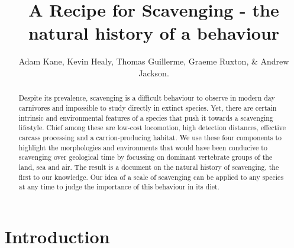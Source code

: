\documentclass[a4paper,12pt]{article}
\title{A Recipe for Scavenging - the natural history of a behaviour}
\author{Adam Kane, Kevin Healy, Thomas Guillerme, Graeme Ruxton, \& Andrew Jackson.}
\begin{document}


\begin{abstract} 
Despite its prevalence, scavenging is a difficult behaviour to observe in modern day carnivores and impossible to study directly in extinct species. 
Yet, there are certain intrinsic and environmental features of a species that push it towards a scavenging lifestyle. Chief among these are low-cost locomotion, high detection distances, effective carcass processing and a carrion-producing habitat. 
We use these four components to highlight the morphologies and environments that would have been conducive to scavenging over geological time by focussing on dominant vertebrate groups of the land, sea and air. 
The result is a document on the natural history of scavenging, the first to our knowledge. 
Our idea of a scale of scavenging can be applied to any species at any time to judge the importance of this behaviour in its diet. 
\end{abstract}

\newpage


\section*{Introduction}
\end{document}
